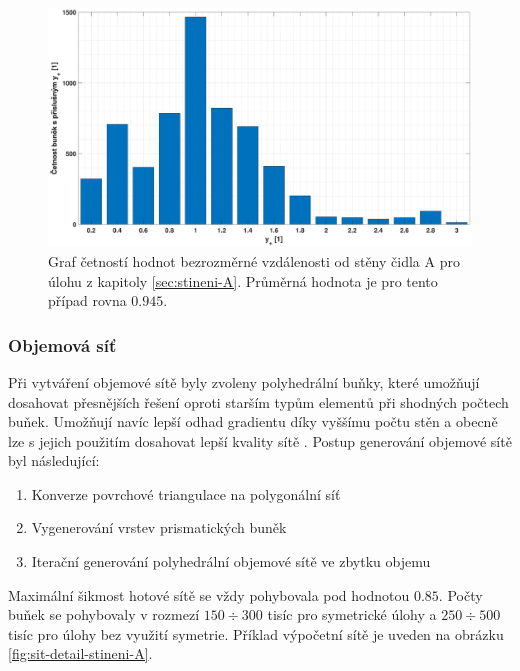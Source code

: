             \begin{figure}[ht!]
                \centering
                \includegraphics*[width=\textwidth, trim={5.0cm 1.0cm 5.8cm 2.0cm}]{300_VYPOCETNI_MODEL/yplus-stineni-A.eps}
                \caption{Graf četností hodnot bezrozměrné vzdálenosti od stěny čidla A pro úlohu z kapitoly \ref{sec:stineni-A}. Průměrná hodnota je pro tento případ rovna $0.945$.}
                \label{fig:yplus-stineni-A}
            \end{figure}

            \newpage


        \subsubsection{Objemová síť}

        Při vytváření objemové sítě byly zvoleny polyhedrální buňky, které umožňují dosahovat přesnějších řešení oproti starším typům elementů při shodných počtech buňek. Umožňují navíc lepší odhad gradientu díky vyššímu počtu stěn a obecně lze s jejich použitím dosahovat lepší kvality sítě \cite{Sosnowski2018}. Postup generování objemové sítě byl následující:

        \begin{enumerate}
            \item Konverze povrchové triangulace na polygonální síť
            \item Vygenerování vrstev prismatických buněk
            \item Iterační generování polyhedrální objemové sítě ve zbytku objemu
        \end{enumerate}

        Maximální šikmost hotové sítě se vždy pohybovala pod hodnotou $0.85$. Počty buňek se pohybovaly v rozmezí $150 \div 300$ tisíc pro symetrické úlohy a $250 \div 500$ tisíc pro úlohy bez využití symetrie. Příklad výpočetní sítě je uveden na obrázku \ref{fig:sit-detail-stineni-A}.

